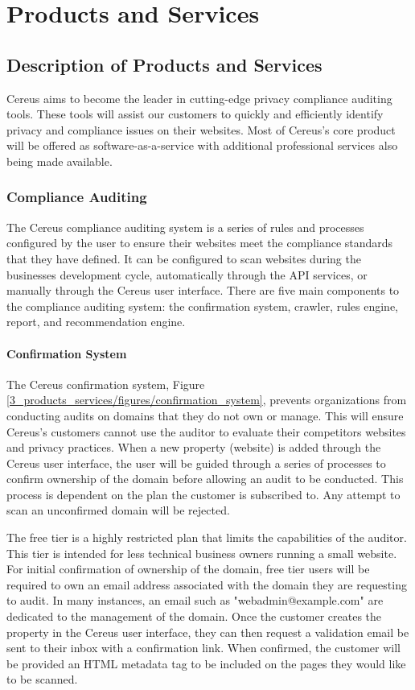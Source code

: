 {\let\cleardoublepage\relax \chapter{Products and Services}}

\section{Description of Products and Services}

Cereus aims to become the leader in cutting-edge privacy compliance auditing tools. These tools will assist our customers to quickly and efficiently identify privacy and compliance issues on their websites. Most of Cereus’s core product will be offered as software-as-a-service with additional professional services also being made available. 

\subsection{Compliance Auditing}

The Cereus compliance auditing system is a series of rules and processes configured by the user to ensure their websites meet the compliance standards that they have defined. It can be configured to scan websites during the businesses development cycle, automatically through the API services, or manually through the Cereus user interface. There are five main components to the compliance auditing system: the confirmation system, crawler, rules engine, report, and recommendation engine.

\subsubsection{Confirmation System}

The Cereus confirmation system, Figure \ref{3_products_services/figures/confirmation_system}, prevents organizations from conducting audits on domains that they do not own or manage. This will ensure Cereus's customers cannot use the auditor to evaluate their competitors websites and privacy practices. When a new property (website) is added through the Cereus user interface, the user will be guided through a series of processes to confirm ownership of the domain before allowing an audit to be conducted. This process is dependent on the plan the customer is subscribed to. Any attempt to scan an unconfirmed domain will be rejected.

The free tier is a highly restricted plan that limits the capabilities of the auditor. This tier is intended for less technical business owners running a small website. For initial confirmation of ownership of the domain, free tier users will be required to own an email address associated with the domain they are requesting to audit. In many instances, an email such as "webadmin@example.com" are dedicated to the management of the domain. Once the customer creates the property in the Cereus user interface, they can then request a validation email be sent to their inbox with a confirmation link. When confirmed, the customer will be provided an HTML metadata tag to be included on the pages they would like to be scanned.

